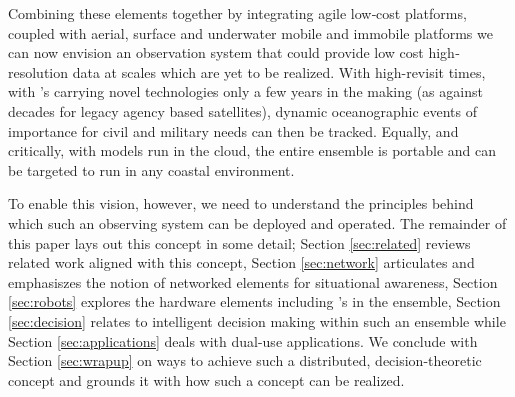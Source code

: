 Combining these elements together by integrating agile low‐cost \sml
platforms, coupled with aerial, surface and underwater mobile and
immobile platforms we can now envision an observation system that
could provide low cost high‐resolution data at scales which are yet to
be realized. With high-revisit times, with \smle's carrying novel
technologies only a few years in the making (as against decades for
legacy agency based satellites), dynamic oceanographic events of
importance for civil and military needs can then be tracked. Equally,
and critically, with models run in the cloud, the entire ensemble is
portable and can be targeted to run in any coastal environment.

To enable this vision, however, we need to understand the principles
behind which such an observing system can be deployed and
operated. The remainder of this paper lays out this concept in some
detail; Section \ref{sec:related} reviews related work aligned with
this concept, Section \ref{sec:network} articulates and emphasiszes
the notion of networked elements for situational awareness, Section
\ref{sec:robots} explores the hardware elements including \smle's in
the ensemble, Section \ref{sec:decision} relates to intelligent
decision making within such an ensemble while Section
\ref{sec:applications} deals with dual-use applications. We conclude
with Section \ref{sec:wrapup} on ways to achieve such a distributed,
decision-theoretic concept and grounds it with how such a concept can
be realized. 